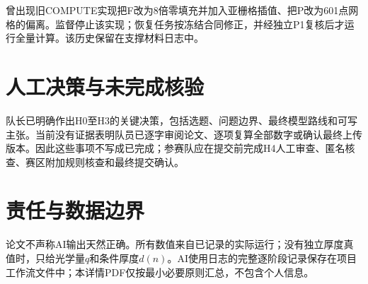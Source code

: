 \documentclass[UTF8,11pt,a4paper]{ctexart}
\begin{document}
曾出现旧COMPUTE实现把F改为8倍零填充并加入亚栅格插值、把P改为601点网格的偏离。监督停止该实现；恢复任务按冻结合同修正，并经独立P1复核后才运行全量计算。该历史保留在支撑材料日志中。

\section{人工决策与未完成核验}
队长已明确作出H0至H3的关键决策，包括选题、问题边界、最终模型路线和可写主张。当前没有证据表明队员已逐字审阅论文、逐项复算全部数字或确认最终上传版本。因此这些事项不写成已完成；参赛队应在提交前完成H4人工审查、匿名核查、赛区附加规则核查和最终提交确认。

\section{责任与数据边界}
论文不声称AI输出天然正确。所有数值来自已记录的实际运行；没有独立厚度真值时，只给光学量$q$和条件厚度$d(n)$。AI使用日志的完整逐阶段记录保存在项目工作流文件中；本详情PDF仅按最小必要原则汇总，不包含个人信息。
\end{document}
